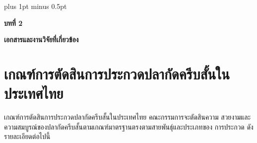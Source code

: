 
\clearpage
\thispagestyle{empty}

\begingroup
\fontsize{16pt}{19.2pt}\selectfont
\justifying
\XeTeXlinebreakskip=0pt plus 1pt minus 0.5pt
\setlength{\parindent}{1.5cm}
\setlength{\parskip}{0pt}

{}
\begin{center}
	{\bfseries\fontsize{18pt}{21.6pt}\selectfont บทที่ 2}
\end{center}

\vspace{\baselineskip}

\begin{center}
	{\bfseries\fontsize{18pt}{21.6pt}\selectfont เอกสารและงานวิจัยที่เกี่ยวข้อง}
\end{center}

\vspace{\baselineskip}

\section*{เกณฑ์การตัดสินการประกวดปลากัดครีบสั้นในประเทศไทย}

\indent เกณฑ์การตัดสินการประกวดปลากัดครีบสั้นในประเทศไทย คณะกรรมการจะตัดสินความ
สวยงามและความสมบูรณ์ของปลากัดครีบสั้นตามเกณฑ์มาตรฐานตรงตามสายพันธุ์และประเภทของ
การประกวด ดังรายละเอียดต่อไปนี้

\vspace{\baselineskip}

\begingroup
\renewcommand{\arraystretch}{1.2}
\setlength{\arrayrulewidth}{0.5pt} %

